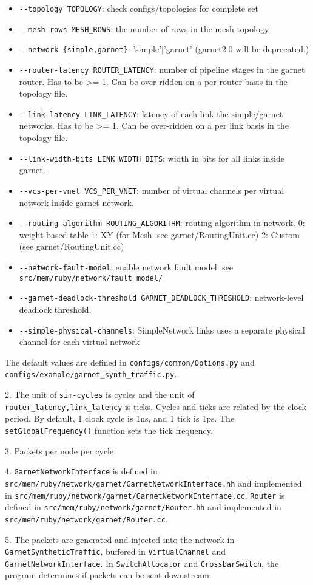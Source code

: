 \documentclass{article}
\begin{document}
\begin{itemize}
	\item \verb|--topology TOPOLOGY|: check configs/topologies for complete set
	\item \verb|--mesh-rows MESH_ROWS|: the number of rows in the mesh topology
	\item \verb|--network {simple,garnet}|: 'simple'|'garnet' (garnet2.0 will be deprecated.)
	\item \verb|--router-latency ROUTER_LATENCY|: number of pipeline stages in the garnet router. Has to be >= 1. Can be over-ridden on a per router basis in the topology file.
	\item \verb|--link-latency LINK_LATENCY|: latency of each link the simple/garnet networks. Has to be >= 1. Can be over-ridden on a per link basis in the topology file.
	\item \verb|--link-width-bits LINK_WIDTH_BITS|: width in bits for all links inside garnet.
	\item \verb|--vcs-per-vnet VCS_PER_VNET|: number of virtual channels per virtual network inside garnet network.
	\item \verb|--routing-algorithm ROUTING_ALGORITHM|: routing algorithm in network. 0: weight-based table 1: XY (for Mesh. see garnet/RoutingUnit.cc) 2: Custom (see garnet/RoutingUnit.cc)
	\item \verb|--network-fault-model|: enable network fault model: see \verb|src/mem/ruby/network/fault_model/|
	\item \verb|--garnet-deadlock-threshold GARNET_DEADLOCK_THRESHOLD|: network-level deadlock threshold.
	\item \verb|--simple-physical-channels|: SimpleNetwork links uses a separate physical channel for each virtual network
\end{itemize}
The default values are defined in \verb|configs/common/Options.py| and \verb|configs/example/garnet_synth_traffic.py|.

2. The unit of \verb|sim-cycles| is cycles and the unit of \verb|router_latency,link_latency| is ticks. Cycles and ticks are related by the clock period. By default, 1 clock cycle is 1ns, and 1 tick is 1ps. The \verb|setGlobalFrequency()| function sets the tick frequency.

3. Packets per node per cycle. 

4. \verb|GarnetNetworkInterface| is defined in \verb|src/mem/ruby/network/garnet/GarnetNetworkInterface.hh| and implemented in \verb|src/mem/ruby/network/garnet/GarnetNetworkInterface.cc|. \verb|Router| is defined in \verb|src/mem/ruby/network/garnet/Router.hh| and implemented in \verb|src/mem/ruby/network/garnet/Router.cc|.

5. The packets are generated and injected into the network in \verb|GarnetSyntheticTraffic|, buffered in \verb|VirtualChannel| and \verb|GarnetNetworkInterface|. In \verb|SwitchAllocator| and \verb|CrossbarSwitch|, the program determines if packets can be sent downstream.
\end{document}
